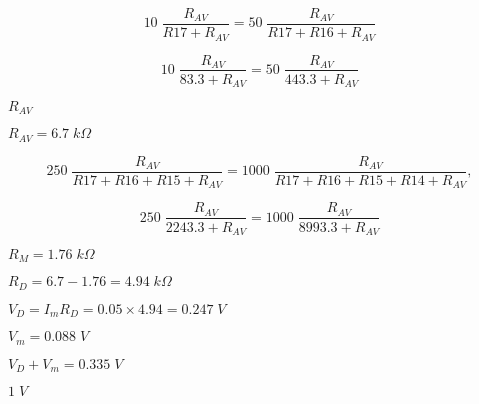 {\newpage\clearpage
{}%
\begin{displaymath}
  10\;\frac{R_{AV}}{R17+R_{AV}}=50\;\frac{R_{AV}}{R17+R16+R_{AV}}
  \end{displaymath}%
\lthtmldisplayZ
\lthtmlcheckvsize\clearpage}

{\newpage\clearpage
{}%
\begin{displaymath}
  10\;\frac{R_{AV}}{83.3+R_{AV}}=50\;\frac{R_{AV}}{443.3+R_{AV}}
  \end{displaymath}%
\lthtmldisplayZ
\lthtmlcheckvsize\clearpage}

{\newpage\clearpage
{}%
$R_{AV}$%
\lthtmlinlinemathZ
\lthtmlcheckvsize\clearpage}

{\newpage\clearpage
{}%
$R_{AV}=6.7\;k\Omega$%
\lthtmlinlinemathZ
\lthtmlcheckvsize\clearpage}

{\newpage\clearpage
{}%
\begin{displaymath}
  250\;\frac{R_{AV}}{R17+R16+R15+R_{AV}}=1000\;\frac{R_{AV}}{R17+R16+R15+R14+R_{AV}},
  \end{displaymath}%
\lthtmldisplayZ
\lthtmlcheckvsize\clearpage}

{\newpage\clearpage
{}%
\begin{displaymath}
  250\;\frac{R_{AV}}{2243.3+R_{AV}}=1000\;\frac{R_{AV}}{8993.3+R_{AV}}
  \end{displaymath}%
\lthtmldisplayZ
\lthtmlcheckvsize\clearpage}

{\newpage\clearpage
{}%
$R_M=1.76\;k\Omega$%
\lthtmlinlinemathZ
\lthtmlcheckvsize\clearpage}

{\newpage\clearpage
{}%
$R_D=6.7-1.76=4.94\;k\Omega$%
\lthtmlinlinemathZ
\lthtmlcheckvsize\clearpage}

{\newpage\clearpage
{}%
$V_D=I_m R_D=0.05\times 4.94=0.247\;V$%
\lthtmlinlinemathZ
\lthtmlcheckvsize\clearpage}

{\newpage\clearpage
{}%
$V_m=0.088\;V$%
\lthtmlinlinemathZ
\lthtmlcheckvsize\clearpage}

{\newpage\clearpage
{}%
$V_D+V_m=0.335\;V$%
\lthtmlinlinemathZ
\lthtmlcheckvsize\clearpage}

{\newpage\clearpage
{}%
$1\;V$%
\lthtmlinlinemathZ
\lthtmlcheckvsize\clearpage}

